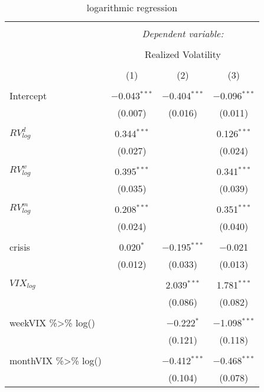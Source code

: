 
\begin{table}[!htbp] \centering 
  \caption{logarithmic regression} 
  \label{} 
\begin{tabular}{@{\extracolsep{5pt}}lccc} 
\\[-1.8ex]\hline 
\hline \\[-1.8ex] 
 & \multicolumn{3}{c}{\textit{Dependent variable:}} \\ 
\cline{2-4} 
\\[-1.8ex] & \multicolumn{3}{c}{Realized Volatility} \\ 
\\[-1.8ex] & (1) & (2) & (3)\\ 
\hline \\[-1.8ex] 
 Intercept & $-$0.043$^{***}$ & $-$0.404$^{***}$ & $-$0.096$^{***}$ \\ 
  & (0.007) & (0.016) & (0.011) \\ 
  & & & \\ 
 $RV^{d}_{log}$ & 0.344$^{***}$ &  & 0.126$^{***}$ \\ 
  & (0.027) &  & (0.024) \\ 
  & & & \\ 
 $RV^{w}_{log}$ & 0.395$^{***}$ &  & 0.341$^{***}$ \\ 
  & (0.035) &  & (0.039) \\ 
  & & & \\ 
 $RV^{m}_{log}$ & 0.208$^{***}$ &  & 0.351$^{***}$ \\ 
  & (0.024) &  & (0.040) \\ 
  & & & \\ 
 crisis & 0.020$^{*}$ & $-$0.195$^{***}$ & $-$0.021 \\ 
  & (0.012) & (0.033) & (0.013) \\ 
  & & & \\ 
 $VIX_{log}$ &  & 2.039$^{***}$ & 1.781$^{***}$ \\ 
  &  & (0.086) & (0.082) \\ 
  & & & \\ 
 weekVIX \%\textgreater \% log() &  & $-$0.222$^{*}$ & $-$1.098$^{***}$ \\ 
  &  & (0.121) & (0.118) \\ 
  & & & \\ 
 monthVIX \%\textgreater \% log() &  & $-$0.412$^{***}$ & $-$0.468$^{***}$ \\ 
  &  & (0.104) & (0.078) \\ 

\end{tabular}
\end{table}

